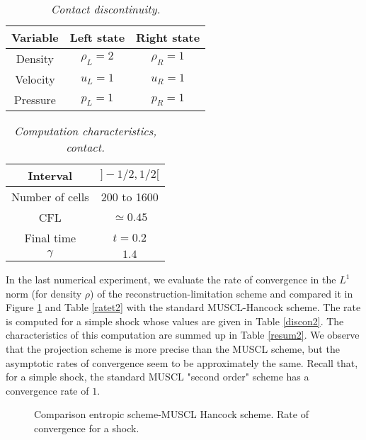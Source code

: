 \documentclass{fldauth}
\theoremstyle{plain}
\theoremstyle{plain}
\theoremstyle{plain}
\theoremstyle{plain}
\theoremstyle{plain}
\theoremstyle{plain}
\begin{document}
\begin{table}[h]
\begin{center}
\begin{tabular}{|c|c|c|}
\hline Variable & Left state & Right state \\
\hline  Density & $\rho_L=2$ & $\rho_R=1$\\
\hline  Velocity & $u_L=1$ & $u_R=1$\\
\hline Pressure & $p_L=1$ & $p_R=1$\\
\hline
\end{tabular}
\caption{\label{discon}\textit{Contact discontinuity.}}
\end{center}
\end{table}

\begin{table}[h]
\begin{center}
\begin{tabular}{|c|c|}
\hline Interval & $]-1/2,1/2[$  \\
\hline  Number of cells & 200 to 1600 \\
\hline  CFL & $\simeq 0.45$ \\
\hline Final time & $t=0.2$ \\
\hline $\gamma$ & $1.4$ \\
\hline
\end{tabular}
\caption{\label{resum}\textit{Computation characteristics,
contact.}}
\end{center}
\end{table}

In the last numerical experiment, we evaluate the rate of
convergence in the $L^1$ norm (for density $\rho$) of the
reconstruction-limitation scheme and compared it in
 Figure
\ref{rate2} and Table \ref{ratet2} with the standard MUSCL-Hancock
scheme. The rate is computed for a simple shock whose values are
given in Table \ref{discon2}. The characteristics of this
computation are summed up in Table \ref{resum2}. We observe that
the projection scheme is more precise than the MUSCL scheme, but
the asymptotic rates of convergence seem to be approximately the
same. Recall that, for a simple shock, the standard MUSCL "second
order" scheme has a convergence rate of $1$.

\begin{figure}[b]
\caption{Comparison entropic scheme-MUSCL Hancock scheme. Rate of
convergence for a shock.\label{rate2}}
\end{figure}
\end{document}
